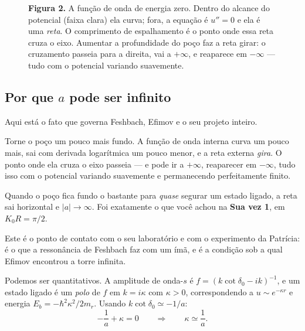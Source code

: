 \documentclass[11pt,a4paper]{article}
\begin{document}
\begin{figure}[htbp]
\begin{tikzpicture}[scale=0.78,
  eixo/.style={->, cinza, semithick},
  onda/.style={azulesc, very thick},
  extrap/.style={vermelhoesc, thick, dashed},
  rot/.style={font=\scriptsize, text=cinza}]
\end{tikzpicture}

\vspace{0.3cm}
\begin{minipage}{0.88\textwidth}
\small\color{cinza}
\textbf{Figura 2.} A função de onda de energia zero. Dentro do alcance do potencial
(faixa clara) ela curva; fora, a equação é $u''=0$ e ela é uma \emph{reta}. O
comprimento de espalhamento é o ponto onde essa reta cruza o eixo. Aumentar a
profundidade do poço faz a reta girar: o cruzamento passeia para a direita, vai a
$+\infty$, e reaparece em $-\infty$ — tudo com o potencial variando suavemente.
\end{minipage}
\end{figure}

\subsection{Por que \texorpdfstring{$a$}{a} pode ser infinito}
\label{sec:divergencia}

Aqui está o fato que governa Feshbach, Efimov e o seu projeto inteiro.

Torne o poço um pouco mais fundo. A função de onda interna curva um pouco mais, sai
com derivada logarítmica um pouco menor, e a reta externa \emph{gira}. O ponto onde
ela cruza o eixo passeia — e pode ir a $+\infty$, reaparecer em $-\infty$, tudo isso
com o potencial variando suavemente e permanecendo perfeitamente finito.

Quando o poço fica fundo o bastante para \emph{quase} segurar um estado ligado, a reta
sai horizontal e $|a|\to\infty$. Foi exatamente o que você achou na
\textbf{Sua vez 1}, em $K_{0}R=\pi/2$.

\begin{center}
\end{center}

Este é o ponto de contato com o seu laboratório e com o experimento da Patrícia: é o
que a ressonância de Feshbach faz com um ímã, e é a condição sob a qual Efimov
encontrou a torre infinita.

Podemos ser quantitativos. A amplitude de onda-$s$ é
$f = \left(k\cot\delta_{0}-ik\right)^{-1}$, e um estado ligado é um \emph{polo} de $f$
em $k=i\kappa$ com $\kappa>0$, correspondendo a $u\sim e^{-\kappa r}$ e energia
$E_{b}=-\hbar^{2}\kappa^{2}/2m_{r}$. Usando $k\cot\delta_{0}\simeq-1/a$:
\begin{equation}
-\frac{1}{a} + \kappa = 0
\qquad\Longrightarrow\qquad
\kappa \simeq \frac{1}{a}.
\end{equation}
\end{document}
